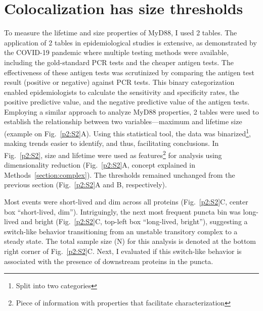 \section{Colocalization has size thresholds}
\label{section:thresholds}
To measure the lifetime and size properties of MyD88, I used 2 tables. The application of 2 tables in epidemiological studies is extensive, as demonstrated by the COVID-19 pandemic where multiple testing methods were available, including the gold-standard PCR tests and the cheaper antigen tests. The effectiveness of these antigen tests was scrutinized by comparing the antigen test result (positive or negative) against PCR tests. This binary categorization enabled epidemiologists to calculate the sensitivity and specificity rates, the positive predictive value, and the negative predictive value of the antigen tests. Employing a similar approach to analyze MyD88 properties, 2 tables were used to establish the relationship between two variables---maximum and lifetime size (example on Fig.~\ref{p2:S2}A). Using this statistical tool, the data was binarized\footnote{Split into two categories}, making trends easier to identify, and thus, facilitating conclusions. In Fig.~\ref{p2:S2}, size and lifetime were used as features\footnote{Piece of information with properties that facilitate characterization} for analysis using dimensionality reduction (Fig.~\ref{p2:S2}A, concept explained in Methods~\ref{section:complex}). The thresholds remained unchanged from the previous section (Fig.~\ref{p2:S2}A and B, respectively).

Most events were short-lived and dim across all proteins (Fig.~\ref{p2:S2}C, center box “short-lived, dim”). Intriguingly, the next most frequent puncta bin was long-lived and bright (Fig.~\ref{p2:S2}C, top-left box “long-lived, bright”), suggesting a switch-like behavior transitioning from an unstable transitory complex to a steady state. The total sample size (N) for this analysis is denoted at the bottom right corner of Fig.~\ref{p2:S2}C. Next, I evaluated if this switch-like behavior is associated with the presence of downstream proteins in the puncta.


